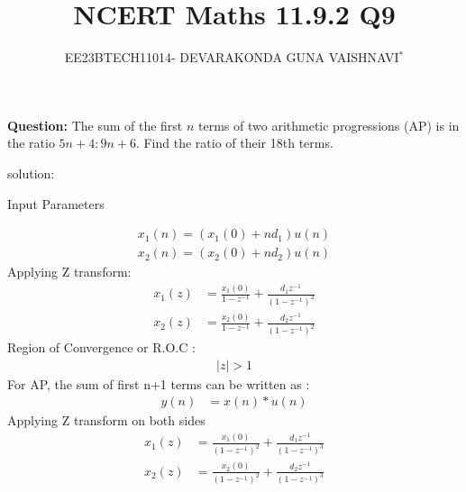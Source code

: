 \documentclass[journal,12pt,twocolumn]{IEEEtran}
\title{
	
	\title{NCERT Maths 11.9.2 Q9}
	\author{EE23BTECH11014- DEVARAKONDA GUNA VAISHNAVI$^{*}$%
	}
	
	
}
\theoremstyle{remark}
\providecommand{\abs}[1]{\left\vert#1\right\vert}
\begin{document}
\maketitle
	
\textbf{Question:} 
The sum of the first $n$ terms of two arithmetic progressions (AP) is in the ratio $5n+4 : 9n+6$. Find the ratio of their 18th terms.

solution:



\begin{table}[h!]
    \centering
    
    \caption{Input Parameters}
    \label{table:parameters}
\end{table}



\begin{align}
x_1(n)=(x_1(0)+nd_1)u(n)
\label{eq:1}
\end{align}
\begin{align}
x_2(n)=(x_2(0)+nd_2)u(n)
\label{eq:2}
\end{align}
Applying Z transform:
\begin{align}
    x_1(z) &=\frac{x_1(0)}{1-z^{-1}} + \frac{d_1z^{-1}}{(1-z^{-1})^2}\\
     x_2(z)&= \frac{x_2(0)}{1-z^{-1}} + \frac{d_2z^{-1}}{(1-z^{-1})^2}
\end{align}
Region of Convergence or R.O.C :
\begin{align}
     \abs{z}>1
\end{align}
For AP, the sum of first n+1 terms can be written as :
\begin{align}
	 y(n)&=x(n)*u(n)
\end{align}  
Applying Z transform on both sides
\begin{align}
 x_1(z) &=\frac{x_1(0)}{(1-z^{-1})^2} + \frac{d_1z^{-1}}{(1-z^{-1})^3}\\
x_2(z)&= \frac{x_2(0)}{(1-z^{-1})^2} + \frac{d_2z^{-1}}{(1-z^{-1})^3}
\end{align}
 
\end{document}
